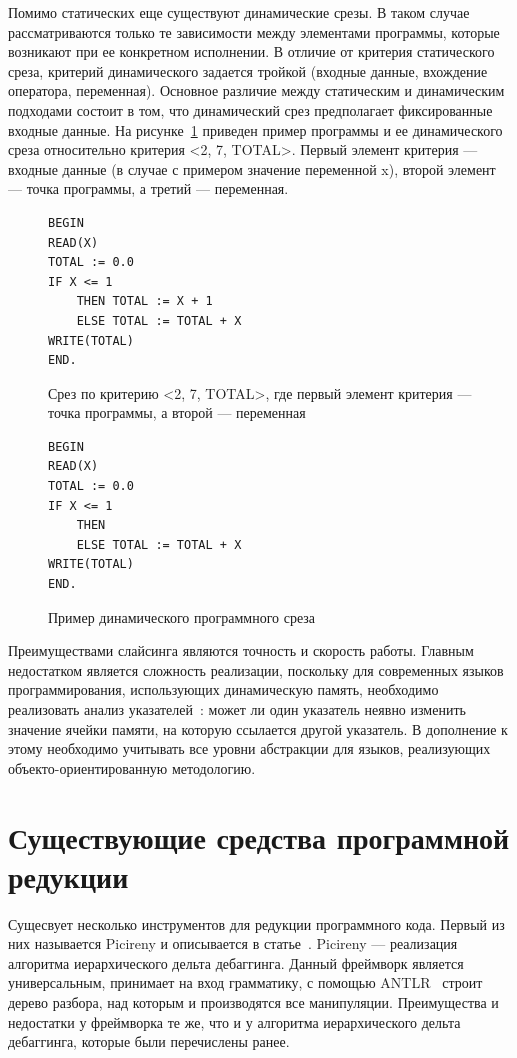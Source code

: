 Помимо статических еще существуют динамические срезы. В таком случае рассматриваются только те зависимости между элементами программы, которые возникают при ее конкретном исполнении. В отличие от критерия статического среза, критерий динамического задается тройкой (входные данные, вхождение оператора, переменная). Основное различие между статическим и динамическим подходами состоит в том, что динамический срез предполагает фиксированные входные данные. На рисунке~\ref{ex:dynslice} приведен пример программы и ее динамического среза относительно критерия <2, 7, {TOTAL}>. Первый элемент критерия --- входные данные (в случае с примером значение переменной x), второй элемент --- точка программы, а третий --- переменная.
\begin{figure}[]
\begin{lstlisting}
BEGIN
READ(X)
TOTAL := 0.0
IF X <= 1
	THEN TOTAL := X + 1
	ELSE TOTAL := TOTAL + X
WRITE(TOTAL)
END.
\end{lstlisting}
Срез по критерию <2, 7, {TOTAL}>, где первый элемент критерия --- точка программы, а второй --- переменная
\begin{lstlisting}
BEGIN
READ(X)
TOTAL := 0.0
IF X <= 1
	THEN
	ELSE TOTAL := TOTAL + X
WRITE(TOTAL)
END.
\end{lstlisting}
\caption{Пример динамического программного среза}
\label{ex:dynslice}
\end{figure}

Преимуществами слайсинга являются точность и скорость работы. Главным недостатком является сложность реализации, поскольку для современных языков программирования, использующих динамическую память, необходимо реализовать анализ указателей~\cite{deutsch1994interprocedural}: может ли один указатель неявно изменить значение ячейки памяти, на которую ссылается другой указатель. В дополнение к этому необходимо учитывать все уровни абстракции для языков, реализующих объекто-ориентированную методологию.

\section{Существующие средства программной редукции}
Сущесвует несколько инструментов для редукции программного кода. Первый из них называется Picireny и описывается в статье~\cite{hodovan2017tree}. Picireny --- реализация алгоритма иерархического дельта дебаггинга. Данный фреймворк является универсальным, принимает на вход грамматику, с помощью ANTLR~\cite{parr2013definitive} строит дерево разбора, над которым и производятся все манипуляции. Преимущества и недостатки у фреймворка те же, что и у алгоритма иерархического дельта дебаггинга, которые были перечислены ранее. 


